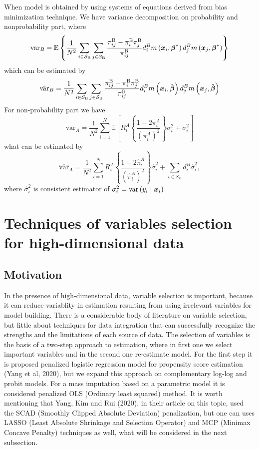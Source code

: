 \documentclass[
  letterpaper,
  DIV=11,
  numbers=noendperiod]{scrreprt}
\begin{document}
When model is obtained by using systems of equations derived from bias
minimization technique. We have variance decomposition on probability
and nonprobability part, where \[
\text{var}_B = \mathbb{E} \left\{\frac{1}{N^2} \sum_{i \in \mathcal{S}_{\mathrm{B}}} \sum_{j \in \mathcal{S}_{\mathrm{B}}} \frac{\pi_{i j}^{\mathrm{B}}-\pi_i^{\mathrm{B}} \pi_j^{\mathrm{B}}}{\pi_{i j}^{\mathrm{B}}} d_i^B m\left(\boldsymbol{x}_i, \boldsymbol{\beta}^*\right) d_j^B m\left(\boldsymbol{x}_j, \boldsymbol{\beta}^*\right) \right\}
\] which can be estimated by \[
\hat{\text{var}}_B = \frac{1}{N^2} \sum_{i \in \mathcal{S}_{\mathrm{B}}} \sum_{j \in \mathcal{S}_{\mathrm{B}}} \frac{\pi_{i j}^{\mathrm{B}}-\pi_i^{\mathrm{B}} \pi_j^{\mathrm{B}}}{\pi_{i j}^{\mathrm{B}}} d_i^B m\left(\boldsymbol{x}_i, \hat{\boldsymbol{\beta}}\right) d_j^B m\left(\boldsymbol{x}_j, \hat{\boldsymbol{\beta}}\right)
\] For non-probability part we have \[
\text{var}_A = \frac{1}{N^2} \sum_{i=1}^N \mathbb{E} \left[R_i^A \left\{ \frac{1 - 2 \pi_i^A}{\left( \pi_i^A \right) ^2} \right\} \sigma_i^2 + \sigma_i^2 \right]
\] what can be estimated by \[
\hat{\text{var}}_A = \frac{1}{N^2} \sum_{i=1}^N R_i^A \left\{ \frac{1 - 2 \hat{\pi}_i^A}{\left( \hat{\pi}_i^A \right) ^2} \right\} \hat{\sigma}_i^2 + \sum_{i \in S_B} d_i^B \hat{\sigma}_i^2,
\] where \(\hat{\sigma}_i^2\) is consistent estimator of
\(\sigma_i^2 = \text{var}\left(y_i \mid \boldsymbol{x}_i\right)\).


\hypertarget{techniques-of-variables-selection-for-high-dimensional-data}{%
\chapter{Techniques of variables selection for high-dimensional
data}\label{techniques-of-variables-selection-for-high-dimensional-data}}

\hypertarget{motivation}{%
\section{Motivation}\label{motivation}}

In the presence of high-dimensional data, variable selection is
important, because it can reduce variablity in estimation resulting from
using irrelevant variables for model building. There is a considerable
body of literature on variable selection, but little about techniques
for data integration that can successfully recognize the strengths and
the limitations of each source of data. The selection of variables is
the basis of a two-step approach to estimation, where in first one we
select important variables and in the second one re-estimate model. For
the first step it is proposed penalized logistic regression model for
propensity score estimation (Yang et al, 2020), but we expand this
approach on complementary log-log and probit models. For a mass
imputation based on a parametric model it is considered penalized OLS
(Ordinary least squared) method. It is worth mentioning that Yang, Kim
and Rui (2020), in their article on this topic, used the SCAD (Smoothly
Clipped Absolute Deviation) penalization, but one can uses LASSO (Least
Absolute Shrinkage and Selection Operator) and MCP (Minimax Concave
Penalty) techniques as well, what will be considered in the next
subsection.
\end{document}
